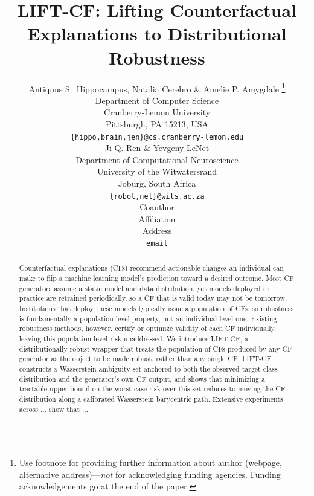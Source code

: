 \documentclass{article} %
\title{\textsc{LIFT-CF}: Lifting Counterfactual \\ Explanations to Distributional Robustness}
\author{Antiquus S.~Hippocampus, Natalia Cerebro \& Amelie P. Amygdale \thanks{ Use footnote for providing further information
about author (webpage, alternative address)---\emph{not} for acknowledging
funding agencies.  Funding acknowledgements go at the end of the paper.} \\
Department of Computer Science\\
Cranberry-Lemon University\\
Pittsburgh, PA 15213, USA \\
\texttt{\{hippo,brain,jen\}@cs.cranberry-lemon.edu} \\
\And
Ji Q. Ren \& Yevgeny LeNet \\
Department of Computational Neuroscience \\
University of the Witwatersrand \\
Joburg, South Africa \\
\texttt{\{robot,net\}@wits.ac.za} \\
\AND
Coauthor \\
Affiliation \\
Address \\
\texttt{email}
}
\theoremstyle{remark}
\theoremstyle{plain}
\theoremstyle{definition}
\begin{document}
\maketitle

\begin{abstract}
Counterfactual explanations (CFs) recommend actionable changes an individual can make to flip a machine learning model's prediction toward a desired outcome. 
Most CF generators assume a static model and data distribution, yet models deployed in practice are retrained periodically, so a CF that is valid today may not be tomorrow. 
Institutions that deploy these models typically issue a population of CFs, so  robustness is fundamentally a population-level property, not an individual-level one.
Existing robustness methods, however, certify or optimize validity of each CF individually, leaving this population-level risk unaddressed.
We introduce \textsc{LIFT-CF}, a distributionally robust wrapper that treats the population of CFs produced by any CF generator as the object to be made robust, rather than any single CF. 
\textsc{LIFT-CF} constructs a Wasserstein ambiguity set anchored to both the observed target-class distribution and the generator's own CF output, and shows that minimizing a tractable upper bound on the worst-case risk over this set reduces to moving the CF distribution along a calibrated Wasserstein barycentric path. \textcolor{latte_maroon}{Extensive experiments across ... show that ...}
\end{abstract}







\clearpage







\end{document}
